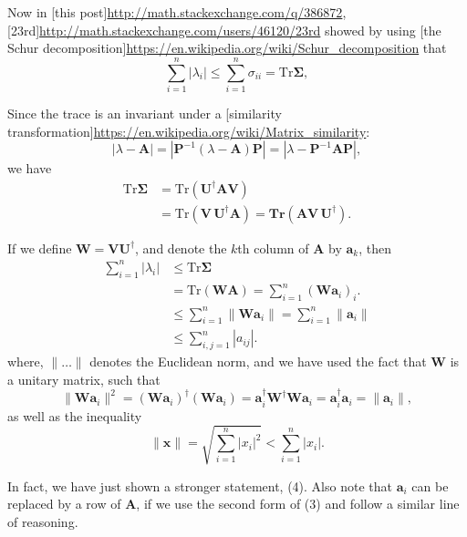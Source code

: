 \documentclass{article}
\begin{document}
Now in [this post]\url{http://math.stackexchange.com/q/386872}, [23rd]\url{http://math.stackexchange.com/users/46120/23rd} showed by using [the Schur decomposition]\url{https://en.wikipedia.org/wiki/Schur\_decomposition} that
\begin{equation}
\sum_{i = 1}^n |\lambda_i|
\le \sum_{i = 1}^n \sigma_{ii}
= \mathrm{Tr} \mathbf \Sigma,
\end{equation}

Since the trace is an invariant under a [similarity transformation]\url{https://en.wikipedia.org/wiki/Matrix\_similarity}:
$$
|\lambda - \mathbf A| = |\mathbf P^{-1}(\lambda - \mathbf A)\mathbf P| = |\lambda - \mathbf P^{-1} \mathbf A \mathbf P|,
$$
we have
\begin{align}
\mathrm{Tr} \mathbf \Sigma
&=
\mathrm{Tr} \left(
  \mathbf U^\dagger \mathbf A \mathbf V
\right) \\
&=
\mathrm{Tr} \left(
  \mathbf V \, \mathbf U^\dagger \mathbf A
\right)
=
\mathbf{Tr} \left(
  \mathbf A \mathbf V \, \mathbf U^\dagger
\right)
.
\tag{3}
\end{align}

If we define $\mathbf W = \mathbf V \mathbf U^\dagger$,
and denote the $k$th column of $\mathbf A$ by $\mathbf a_k$,
then
\begin{align}
\sum_{i = 1}^n |\lambda_i|
&\le
\mathrm{Tr} \mathbf \Sigma \\
&=
\mathrm{Tr} \left(
  \mathbf W \mathbf A
\right)
=
\sum_{i = 1}^n
\left(
\mathbf W \mathbf a_i \right)_i.
\\
&\le
\sum_{i = 1}^n
\| \mathbf W \mathbf a_i  \|
=
\sum_{i = 1}^n
\| \mathbf a_i  \|
\tag{4}
\\
&\le \sum_{i,j=1}^n |a_{ij}|.
\end{align}
where, $\| \dots \|$ denotes the Euclidean norm,
and we have used the fact that $\mathbf W$
is a unitary matrix, such that
$$
\| \mathbf W \mathbf a_i \|^2
=
(\mathbf W \mathbf a_i)^\dagger
(\mathbf W \mathbf a_i)
=
\mathbf a_i^\dagger \mathbf W^\dagger
\mathbf W \mathbf a_i
=
\mathbf a_i^\dagger \mathbf a_i = \| \mathbf a_i \|,
$$
as well as the inequality
$$
\| \mathbf x \|
= \sqrt{ \sum_{i = 1}^n |x_i|^2 }
< \sum_{i = 1}^n |x_i|.
$$

In fact, we have just shown a stronger statement, (4).
Also note that $\mathbf a_i$ can be replaced
by a row of $\mathbf A$, if we use the second form of (3)
and follow a similar line of reasoning.
\end{document}
